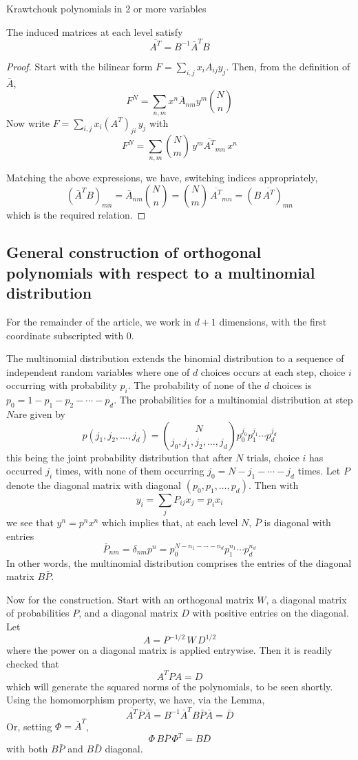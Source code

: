 \documentclass[runningheads]{llncs}
\begin{document}
\begin{section}{Krawtchouk polynomials in 2 or more variables}
\begin{lemma}
The induced matrices at each level satisfy
$$ \overline{A^T}=B^{-1}{\bar A}^T B$$
\end{lemma}
\begin{proof}
Start with the bilinear form $\displaystyle F=\sum_{i,j}x_iA_{ij}y_j$. Then, from the definition of $\bar A$,
$$F^N=\sum_{n,m} x^n \bar A_{nm} y^m \binom{N}{n}$$
Now write $\displaystyle F=\sum_{i,j}x_i(A^T)_{ji}\,y_j$ with
$$F^N=\sum_{n,m} \binom{N}{m}\,y^m\overline{A^T}_{mn}\,x^n$$

Matching the above expressions, we have, switching indices appropriately,
$$({\bar A}^T B)_{mn}=\bar A_{nm}\binom{N}{n}=\binom{N}{m}\, \overline{A^T}_{mn}=(B\, \overline{A^T})_{mn}$$
which is the required relation.
\end{proof}

\subsection{General construction of orthogonal polynomials with respect to a multinomial distribution}
For the remainder of the article, we work in $d+1$ dimensions, with the first coordinate subscripted with $0$.

The multinomial distribution extends the binomial distribution to a sequence of independent random variables where
one of $d$ choices occurs at each step, choice $i$ occurring with probability $p_i$. The probability of none of the $d$ choices
is $p_0=1-p_1-p_2-\cdots-p_d$. The probabilities for a multinomial distribution at step $N$are given by
$$p(j_1,j_2,\ldots,j_d)= \binom{N}{j_0,j_1,j_2,\ldots,j_d} p_0^{j_0}p_1^{j_1}\cdots p_d^{j_d}$$
this being the joint probability distribution that after $N$ trials, choice $i$ has occurred $j_i$ times, with none of them occurring
$j_0=N-j_1-\cdots-j_d$ times. Let $P$ denote the diagonal matrix with diagonal $(p_0,p_1,\ldots,p_d)$. Then with
$$y_i=\sum_j P_{ij} x_j=p_ix_i$$
we see that $y^n=p^nx^n$ which implies that, at each level $N$, $\bar P$ is diagonal with entries
$$\bar P_{nm}=\delta_{nm}p^n=p_0^{N-n_1-\cdots-n_d}p_1^{n_1}\cdots p_d^{n_d}$$
In other words, the multinomial distribution comprises the entries of the diagonal matrix $B\bar P$.

Now for the construction. Start with an orthogonal matrix $W$, a diagonal matrix of probabilities $P$, and 
a diagonal matrix $D$ with positive entries on the diagonal. Let
\begin{equation}\label{eq:start}
A=P^{-1/2}\,W\,D^{1/2}
\end{equation}
where the power on a diagonal matrix is applied entrywise. Then it is readily checked that
$$A^TPA=D$$
which will generate the squared norms of the polynomials, to be seen shortly. Using the homomorphism property, we have, via the Lemma,
$$ \overline{A^T} \bar P \bar A=B^{-1}{\bar A}^TB\bar P \bar A=\bar D$$
Or, setting $\Phi={\bar A}^T$,
\begin{equation}\label{eq:krav}
\Phi\, B\bar P\, \Phi^T=B\bar D
\end{equation}
with both $B\bar P$ and $B\bar D$ diagonal.


\end{section}
\end{document}
